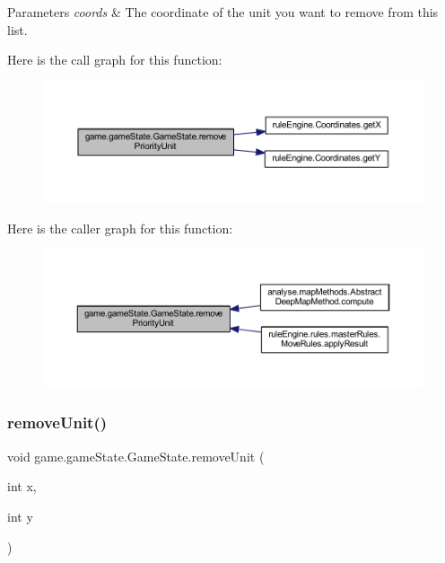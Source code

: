 \begin{DoxyParams}{Parameters}
{\em coords} & The coordinate of the unit you want to remove from this list. \\
\hline
\end{DoxyParams}
Here is the call graph for this function\+:
\nopagebreak
\begin{figure}[H]
\begin{center}
\leavevmode
\includegraphics[width=350pt]{classgame_1_1game_state_1_1_game_state_a97278bc7001044fe8be64c4a9e890867_cgraph}
\end{center}
\end{figure}
Here is the caller graph for this function\+:
\nopagebreak
\begin{figure}[H]
\begin{center}
\leavevmode
\includegraphics[width=350pt]{classgame_1_1game_state_1_1_game_state_a97278bc7001044fe8be64c4a9e890867_icgraph}
\end{center}
\end{figure}
\mbox{\label{classgame_1_1game_state_1_1_game_state_a671269ff7143ada95e467bc922be519e}} 
\subsubsection{\texorpdfstring{remove\+Unit()}{removeUnit()}}
{\footnotesize\ttfamily void game.\+game\+State.\+Game\+State.\+remove\+Unit (\begin{DoxyParamCaption}\item[{int}]{x,  }\item[{int}]{y }\end{DoxyParamCaption})\hspace{0.3cm}{\ttfamily [inline]}}

